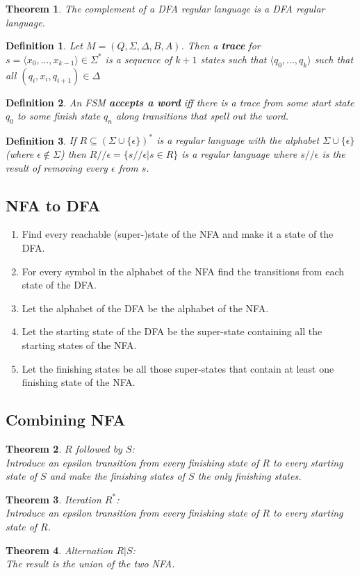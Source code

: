 \documentclass{article}
\theoremstyle{sltheorem}
\newtheorem{definition}{Definition}
\newtheorem{theorem}{Theorem}
\begin{document}
\begin{theorem}
	The complement of a DFA regular language is a DFA regular language.
\end{theorem}
\begin{definition}
	Let $M=(Q,\Sigma,\Delta,B,A)$. Then a \textbf{trace} for $s=\langle x_0,...,x_{k-1}\rangle\in\Sigma^*$ is a sequence of $k+1$ states such that $\langle q_0, ...,q_k\rangle$ such that all $(q_i,x_i,q_{i+1})\in\Delta$
\end{definition}
\begin{definition}
	An FSM \textbf{accepts a word} iff there is a trace from some start state $q_0$ to some finish state $q_n$ along transitions that spell out the word.
\end{definition}
\begin{definition}
	If $R\subseteq(\Sigma\cup\{\epsilon\})^*$ is a regular language with the alphabet $\Sigma\cup\{\epsilon\}$ (where $\epsilon\not\in\Sigma$) then $R//\epsilon=\{s//\epsilon|s\in R\}$ is a regular language where $s//\epsilon$ is the result of removing every $\epsilon$ from $s$.
\end{definition}
\subsection{NFA to DFA}
\begin{enumerate}
	\item Find every reachable (super-)state of the NFA and make it a state of the DFA.
	\item For every symbol in the alphabet of the NFA find the transitions from each state of the DFA.
	\item Let the alphabet of the DFA be the alphabet of the NFA.
	\item Let the starting state of the DFA be the super-state containing all the starting states of the NFA.
	\item Let the finishing states be all those super-states that contain at least one finishing state of the NFA.
\end{enumerate}
\subsection{Combining NFA}
\begin{theorem}
	$R$ followed by $S$:\\
	Introduce an epsilon transition from every finishing state of $R$ to every starting state of $S$ and make the finishing states of $S$ the only finishing states.
\end{theorem}
\begin{theorem}
	Iteration $R^*$:\\
	Introduce an epsilon transition from every finishing state of $R$ to every starting state of $R$.
\end{theorem}
\begin{theorem}
	Alternation $R|S$:\\
	The result is the union of the two NFA.
\end{theorem}
\end{document}
